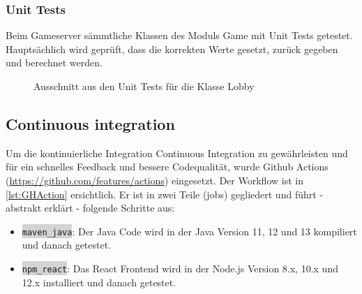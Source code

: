 \documentclass[11pt,ngerman]{article}
\newcommand{\inlinecode}[2]{\colorbox{lightgray}{\lstinline[language=#1]$#2$}}
\begin{document}
    \subsubsection{Unit Tests}
	Beim Gameserver sämmtliche Klassen des Moduls Game mit Unit Tests getestet. Hauptsächlich wird geprüft, dass die korrekten Werte gesetzt, zurück gegeben und berechnet werden.
	\begin{figure}[H]
		\centering
		\caption{Ausschnitt aus den Unit Tests für die Klasse Lobby}
		\label{fig:lobby_unit_tests}
	\end{figure}

    \subsection{Continuous integration}
    Um  die kontinuierliche Integration \Gls{Continuous Integration} zu gewährleisten und für ein schnelles Feedback und bessere Codequalität, wurde Github Actions (\url{https://github.com/features/actions}) eingesetzt. Der Workflow ist in \autoref{lst:GHAction} ersichtlich. Er ist in zwei Teile (jobs) gegliedert und führt - abstrakt erklärt - folgende Schritte aus:

    \begin{itemize}
        \item \inlinecode{bash}{maven_java}: Der Java Code wird in der Java Version 11, 12 und 13 kompiliert und danach getestet.
        \item \inlinecode{bash}{npm_react}: Das React Frontend wird in der Node.js Version 8.x, 10.x und 12.x installiert und danach getestet.
    \end{itemize}
\end{document}

